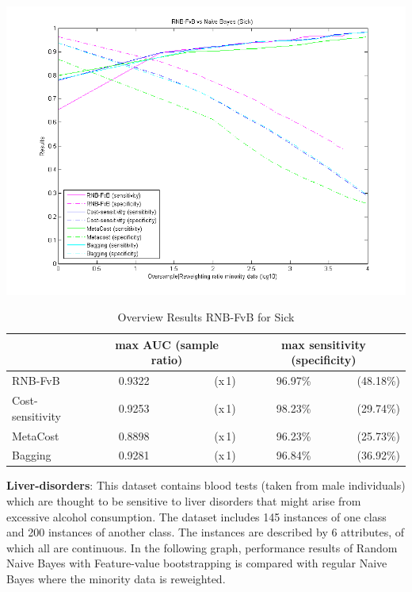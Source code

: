 \includegraphics[scale=0.65]{img/RNB-FvB-sick.png}

\begin{table}[h]
\centering  
\begin{tabular}{ l | c r | r r|}                                      
& \multicolumn{2}{c}{max AUC (sample ratio)} & \multicolumn{2}{c}{max sensitivity (specificity)} \\
\hline 
RNB-FvB & 0.9322 & (x\,1) & 96.97\% & (48.18\%)\\
Cost-sensitivity & 0.9253 & (x\,1) & 98.23\% & (29.74\%)\\
MetaCost & 0.8898 & (x\,1) & 96.23\% & (25.73\%)\\
Bagging & 0.9281 & (x\,1) & 96.84\% & (36.92\%)\\
\hline                          %
\end{tabular}
\label{tab:PPer}
\caption{Overview Results RNB-FvB for Sick} %
\end{table}

\newpage
\textbf{Liver-disorders}: This dataset contains blood tests (taken from male individuals) which are thought to be sensitive to liver disorders that might arise from excessive alcohol consumption. The dataset includes 145 instances of one class and 200 instances of another class. The instances are described by 6 attributes, of which all are continuous. In the following graph, performance results of Random Naive Bayes with Feature-value bootstrapping is compared with regular Naive Bayes where the minority data is reweighted.

